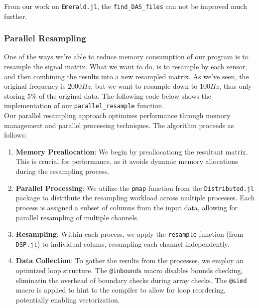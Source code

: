 From our work on \texttt{Emerald.jl}, the \texttt{find\_DAS\_files} can not be improved much further. 



\subsubsection{Parallel Resampling}

One of the ways we're able to reduce memory consumption of our program is to resample the signal matrix. What we want to do, is to resample by each sensor, and then combining the results into a new resampled matrix. As we've seen, the original frequency is $2000Hz$, but we want to resample down to $100Hz$, thus only storing $5\%$ of the original data. The following code below shows the implementation of our \texttt{parallel\_resample} function. \\



Our parallel resampling approach optimizes performance through memory management and parallel processing techniques. The algorithm proceeds as follows:

\begin{enumerate}
    \item \textbf{Memory Preallocation}: We begin by preallocationg the resultant matrix. This is crucial for performance, as it avoids dynamic memory allocations during the resampling process.
    \item \textbf{Parallel Processing}: We utilize the \texttt{pmap} function from the \texttt{Distributed.jl} package to distribute the resampling workload across multiple processes. Each process is assigned a subset of columns from the input data, allowing for parallel resampling of multiple channels.
    \item \textbf{Resampling}: Within each process, we apply the \texttt{resample} function (from \texttt{DSP.jl}) to individual colums, resampling each channel independently.
    \item \textbf{Data Collection}: To gather the results from the processes, we employ an optimized loop structure. The \texttt{@inbounds} macro disables bounds checking, eliminatin the overhead of boundary checks during array checks. The \texttt{@simd} macro is applied to hint to the compiler to allow for loop reordering, potentially enabling vectorization.
\end{enumerate}


